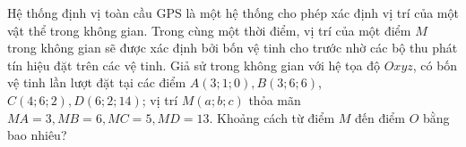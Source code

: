 \documentclass[12pt,a4paper]{article}
\begin{document}
\begin{ex}%
Hệ thống định vị toàn cầu GPS là một hệ thống cho phép xác định vị trí của một vật thể trong không gian. Trong cùng một thời điểm, vị trí của một điểm $M$ trong không gian sẽ được xác định bởi bốn vệ tinh cho trước nhờ các bộ thu phát tín hiệu đặt trên các vệ tinh. Giả sử trong không gian với hệ tọa độ $O x y z$, có bốn vệ tinh lần lượt đặt tại các điểm $A(3 ; 1 ; 0), B(3 ; 6 ; 6)$, $C(4 ; 6 ; 2), D(6 ; 2 ; 14)$; vị trí $M(a ; b ; c)$ thỏa mãn $M A=3, M B=6, M C=5, M D=13$.
Khoảng cách từ điểm $M$ đến điểm $O$ bằng bao nhiêu?
\end{ex}
\end{document}
